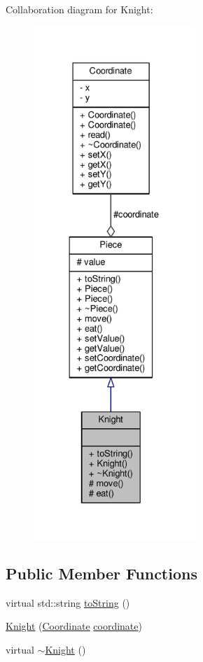 Collaboration diagram for Knight\+:\nopagebreak
\begin{figure}[H]
\begin{center}
\leavevmode
\includegraphics[height=550pt]{class_knight__coll__graph}
\end{center}
\end{figure}
\subsection*{Public Member Functions}
\begin{DoxyCompactItemize}
\item 
virtual std\+::string \hyperlink{class_knight_a3ecdeb255fa07eaa22d0cc948520c181}{to\+String} ()
\item 
\hyperlink{class_knight_ada9451f9c4ae0b30e7c0f0eaa7c78aac}{Knight} (\hyperlink{class_coordinate}{Coordinate} \hyperlink{class_piece_a9e92373c8fffc1f5efb20d62204b70cf}{coordinate})
\item 
virtual \hyperlink{class_knight_a2754123d6876babe915f4da8f761361b}{$\sim$\+Knight} ()
\end{DoxyCompactItemize}
